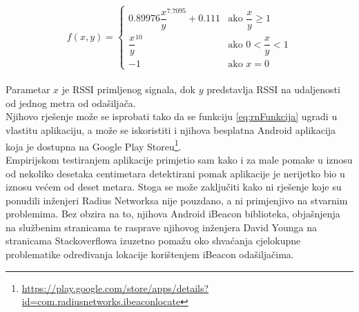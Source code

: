 \begin{equation}
	\label{eq:rnFunkcija}
	f(x,y) = 
	\begin{cases}	
	0.89976 {\dfrac{x}{y}}^{7.7095} + 0.111 & \text{ako } \dfrac{x}{y} \geq 1 \\
	{\dfrac{x}{y}}^{10} & \text{ako } 0 < \dfrac{x}{y} < 1 \\
	-1 & \text{ako } x = 0 	
	\end{cases}
\end{equation}
\\

Parametar $x$ je RSSI primljenog signala, dok $y$ predstavlja RSSI na udaljenosti od jednog metra od odašiljača. 
\\

Njihovo rješenje može se isprobati tako da se funkciju \eqref{eq:rnFunkcija} ugradi u vlastitu aplikaciju, a može se iskoristiti i njihova besplatna Android aplikacija koja je dostupna na Google Play Storeu\footnote{\url{https://play.google.com/store/apps/details?id=com.radiusnetworks.ibeaconlocate}}.
\\
Empirijskom testiranjem aplikacije primjetio sam kako i za male pomake u iznosu od nekoliko desetaka centimetara detektirani pomak aplikacije je nerijetko bio u iznosu većem od deset metara. 
Stoga se može zaključiti kako ni rješenje koje su ponudili inženjeri Radius Networksa nije pouzdano, a ni primjenjivo na stvarnim problemima. 
Bez obzira na to, njihova Android iBeacon biblioteka, objašnjenja na službenim stranicama te rasprave njihovog inženjera David Younga na stranicama Stackoverflowa izuzetno pomažu oko shvaćanja cjelokupne problematike određivanja lokacije korištenjem iBeacon odašiljačima.












